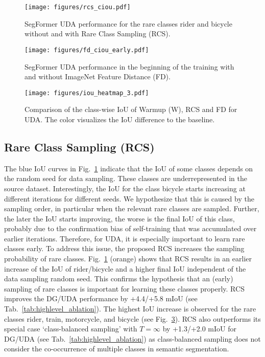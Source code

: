 \documentclass[journal,compsoc]{IEEEtran}
\begin{document}
\begin{figure}
\centering
\texttt{[image: figures/rcs\_ciou.pdf]}
\vspace{-0.8cm}
\caption{SegFormer UDA performance for the rare classes rider and bicycle without and with Rare Class Sampling (RCS).}
\label{fig:RCS_iou}
\end{figure}
\begin{figure}
\centering
\texttt{[image: figures/fd\_ciou\_early.pdf]}
\vspace{-0.8cm}
\caption{SegFormer UDA performance in the beginning of the training with and without ImageNet Feature Distance (FD).}
\label{fig:fd_iou}
\end{figure}


\begin{figure}
\centering
\texttt{[image: figures/iou\_heatmap\_3.pdf]}
\vspace{-0.8cm}
\caption{Comparison of the class-wise IoU of Warmup (W), RCS and FD for UDA. The color visualizes the IoU difference to the baseline.}
\label{fig:ciou_heatmap}
\end{figure}


\subsection{Rare Class Sampling (RCS)}
\label{sec:exp_rcs}

The blue IoU curves in Fig.~\ref{fig:RCS_iou} indicate that the IoU of some classes depends on the random seed for data sampling. These classes are underrepresented in the source dataset. Interestingly, the IoU for the class bicycle starts increasing at different iterations for different seeds. We hypothesize that this is caused by the sampling order, in particular when the relevant rare classes are sampled. Further, the later the IoU starts improving, the worse is the final IoU of this class, probably due to the confirmation bias of self-training that was accumulated over earlier iterations.
Therefore, for UDA, it is especially important to learn rare classes early.
To address this issue, the proposed RCS increases the sampling probability of rare classes.
Fig.~\ref{fig:RCS_iou} (orange) shows that RCS results in an earlier increase of the IoU of rider/bicycle and a higher final IoU independent of the data sampling random seed. This confirms the hypothesis that an (early) sampling of rare classes is important for learning these classes properly. 
RCS improves the DG/UDA performance by +4.4/+5.8 mIoU (see Tab.~\ref{tab:highlevel_ablation}).
The highest IoU increase is observed for the rare classes rider, train, motorcycle, and bicycle (see Fig.~\ref{fig:ciou_heatmap}).
RCS also outperforms its special case `class-balanced sampling' with $T {=} \infty$ by +1.3/+2.0 mIoU for DG/UDA (see Tab.~\ref{tab:highlevel_ablation}) as class-balanced sampling does not consider the co-occurrence of multiple classes in semantic segmentation.
\end{document}
